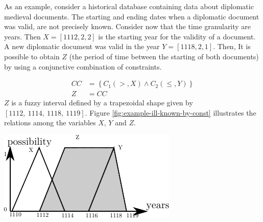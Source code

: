 \begin{example}
As an example, consider a historical database containing data about diplomatic medieval documents. The starting and ending dates when a diplomatic document was valid, are not precisely known.  Consider now that the time granularity are years. Then $X = \left[1112, 2, 2\right]$ is the starting year for the validity of a document. A new diplomatic document was valid in the year $Y = \left[1118, 2, 1 \right]$. Then, It is possible to obtain $Z$ (the period of time between the starting of both documents) by using a conjunctive combination of constraints.

\begin{align}
\nonumber
CC &= \left \lbrace C_1\left(>,X\right) \wedge C_2(\leq,Y) \right \rbrace \\
\nonumber
Z &= CC
\end{align}
$Z$ is a fuzzy interval defined by a trapezoidal shape given by $\left[1112,\ 1114,\ 1118,\ 1119 \right]$.
Figure \ref{fig:example-ill-known-by-const} illustrates the relations among the variables $X$, $Y$ and $Z$.
\end{example}

\begin{samepage}
\vspace*{13pt}
\begin{center}
{
\includegraphics[scale=1]{./graphs/ill-known-by-constraints.pdf}

}
\end{center}
\vspace*{10pt}
\vspace*{13pt}
\end{samepage}

